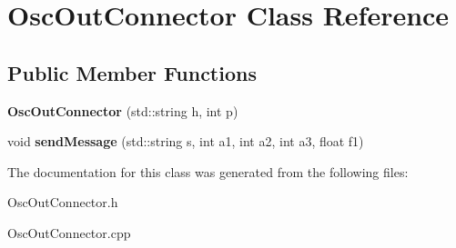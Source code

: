 \hypertarget{classOscOutConnector}{}\section{Osc\+Out\+Connector Class Reference}
\label{classOscOutConnector}
\subsection*{Public Member Functions}
\begin{DoxyCompactItemize}
\item 
{\bfseries Osc\+Out\+Connector} (std\+::string h, int p)\hypertarget{classOscOutConnector_a7dde00203135c4a673e56f02dec774b4}{}\label{classOscOutConnector_a7dde00203135c4a673e56f02dec774b4}

\item 
void {\bfseries send\+Message} (std\+::string s, int a1, int a2, int a3, float f1)\hypertarget{classOscOutConnector_a8b3bcadf0295998b42753161ae9d17ee}{}\label{classOscOutConnector_a8b3bcadf0295998b42753161ae9d17ee}

\end{DoxyCompactItemize}


The documentation for this class was generated from the following files\+:\begin{DoxyCompactItemize}
\item 
Osc\+Out\+Connector.\+h\item 
Osc\+Out\+Connector.\+cpp\end{DoxyCompactItemize}
